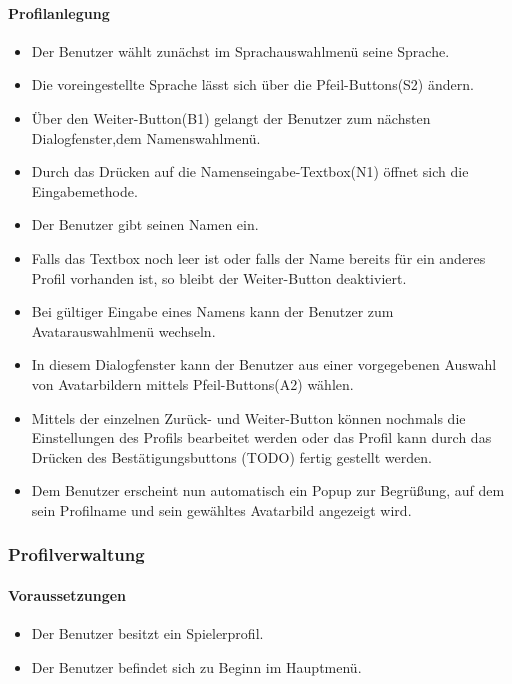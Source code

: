 \paragraph{Profilanlegung}
\begin{itemize}
	\item Der Benutzer wählt zunächst im Sprachauswahlmenü seine Sprache.
	\item Die voreingestellte Sprache lässt sich über die Pfeil-Buttons(S2) ändern.
	\item Über den Weiter-Button(B1) gelangt der Benutzer zum nächsten Dialogfenster,dem Namenswahlmenü.
	\item Durch das Drücken auf die Namenseingabe-Textbox(N1) öffnet sich die Eingabemethode.
	\item Der Benutzer gibt seinen Namen ein.
	\item Falls das Textbox noch leer ist oder falls der Name bereits für ein anderes Profil vorhanden ist, so bleibt der Weiter-Button deaktiviert.
	\item Bei gültiger Eingabe eines Namens kann der Benutzer zum Avatarauswahlmenü wechseln.
	\item In diesem Dialogfenster kann der Benutzer aus einer vorgegebenen Auswahl von Avatarbildern mittels Pfeil-Buttons(A2) wählen.
	\item Mittels der einzelnen Zurück- und Weiter-Button können nochmals die Einstellungen des Profils bearbeitet werden oder das Profil kann durch das Drücken des Bestätigungsbuttons (TODO) fertig gestellt werden.
	\item Dem Benutzer erscheint nun automatisch ein Popup zur Begrüßung, auf dem sein Profilname und sein gewähltes Avatarbild angezeigt wird.
\end{itemize}

\subsubsection{Profilverwaltung}
\paragraph{Voraussetzungen}
\begin{itemize}
	\item Der Benutzer besitzt ein Spielerprofil.
	\item Der Benutzer befindet sich zu Beginn im Hauptmenü.
\end{itemize}
